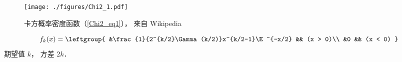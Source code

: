 
\begin{issues}
\issueDraft
\end{issues}

\begin{figure}[ht]
\centering
\texttt{[image: ./figures/Chi2\_1.pdf]}
\caption{卡方概率密度函数（\autoref{Chi2_eq1}）， 来自 Wikipedia} \label{Chi2_fig1}
\end{figure}

\begin{equation}\label{Chi2_eq1}
f_k(x) = \leftgroup{
&\frac{1}{2^{k/2}\Gamma(k/2)}x^{k/2-1}\E^{-x/2} && (x > 0)\\
&0 && (x < 0)
}\end{equation}
期望值 $k$， 方差 $2k$．
